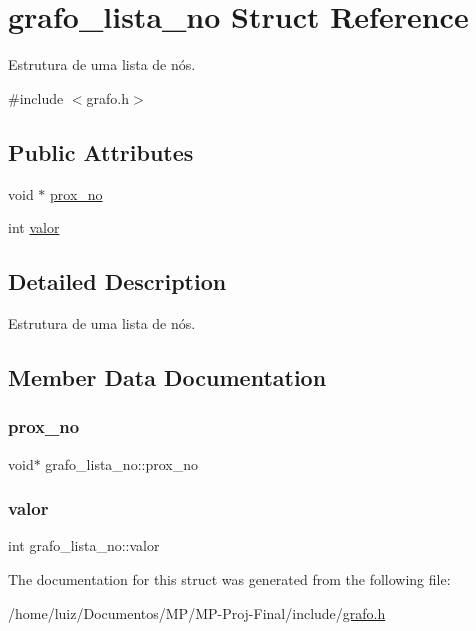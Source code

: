 \hypertarget{structgrafo__lista__no}{}\section{grafo\+\_\+lista\+\_\+no Struct Reference}
\label{structgrafo__lista__no}


Estrutura de uma lista de nós.  




{\ttfamily \#include $<$grafo.\+h$>$}

\subsection*{Public Attributes}
\begin{DoxyCompactItemize}
\item 
void $\ast$ \hyperlink{structgrafo__lista__no_a40128641c090e70856c4cf1f1da3d3b0}{prox\+\_\+no}
\item 
int \hyperlink{structgrafo__lista__no_a48bafc7226ec5009dae41831329db12c}{valor}
\end{DoxyCompactItemize}


\subsection{Detailed Description}
Estrutura de uma lista de nós. 

\subsection{Member Data Documentation}
\mbox{\label{structgrafo__lista__no_a40128641c090e70856c4cf1f1da3d3b0}} 
\subsubsection{\texorpdfstring{prox\+\_\+no}{prox\_no}}
{\footnotesize\ttfamily void$\ast$ grafo\+\_\+lista\+\_\+no\+::prox\+\_\+no}

\mbox{\label{structgrafo__lista__no_a48bafc7226ec5009dae41831329db12c}} 
\subsubsection{\texorpdfstring{valor}{valor}}
{\footnotesize\ttfamily int grafo\+\_\+lista\+\_\+no\+::valor}



The documentation for this struct was generated from the following file\+:\begin{DoxyCompactItemize}
\item 
/home/luiz/\+Documentos/\+M\+P/\+M\+P-\/\+Proj-\/\+Final/include/\hyperlink{grafo_8h}{grafo.\+h}\end{DoxyCompactItemize}
